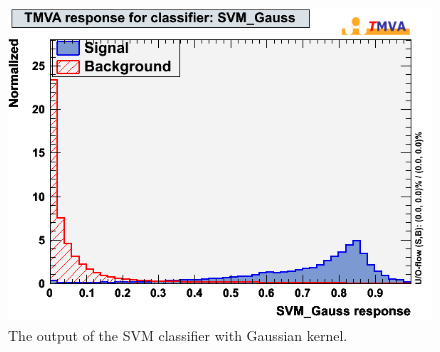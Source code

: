 \begin{figure}[h]
  \begin{center}
    \includegraphics[width=.3\textwidth]{images/mk_svm_gauss}
  \end{center}
  \caption{The output of the SVM classifier with Gaussian kernel.}
  \label{fig:mkSvmGauss}
\end{figure}


\clearpage
